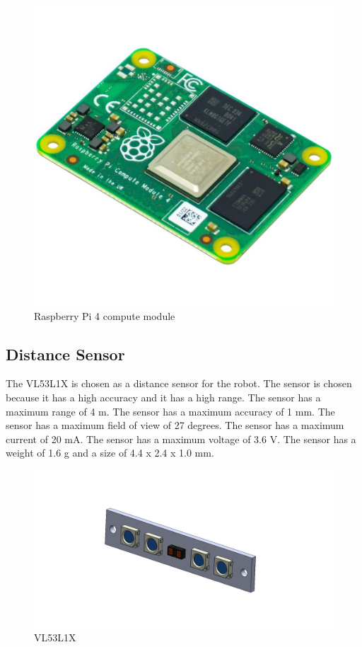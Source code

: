 \begin{figure}[h]
	\centering
	\includegraphics[width=0.5\linewidth]{Raspberry_Pi_4_compute_module}
	\caption[Raspberry Pi 4 compute module]{Raspberry Pi 4 compute module}
	\label{fig:Raspberry_Pi_4}
\end{figure}
\subsection{Distance Sensor}
The VL53L1X is chosen as a distance sensor for the robot. The sensor is chosen because it has a high accuracy and it has a high range. The sensor has a maximum range of 4 m. The sensor has a maximum accuracy of 1 mm. The sensor has a maximum field of view of 27 degrees. The sensor has a maximum current of 20 mA. The sensor has a maximum voltage of 3.6 V. The sensor has a weight of 1.6 g and a size of 4.4 x 2.4 x 1.0 mm.
\begin{figure}[h]
	\centering
	\includegraphics[width=0.5\linewidth]{VL53L1X}
	\caption[VL53L1X]{VL53L1X}
	\label{fig:VL53L1X}
	\end{figure}
